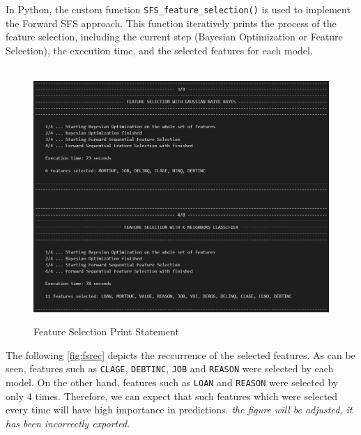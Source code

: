 In Python, the custom function \lstinline{SFS_feature_selection()} is used to implement the Forward SFS approach.
This function iteratively prints the process of the feature selection, including the current step (Bayesian Optimization or Feature Selection), the execution time, and the selected features for each model.

\begin{figure}[H]
    \centering
    \caption{Feature Selection Print Statement}\vspace{0.5em}
    \label{fig:fsprint}\
    \includegraphics[width=140mm]{Figures/fs_print.jpg}
    \vspace{-1em}
\end{figure}


The following \autoref{fig:fsrec} depicts the reccurrence of the selected features. As can be seen, features such as \texttt{CLAGE}, \texttt{DEBTINC}, \texttt{JOB} and \texttt{REASON} were selected by each model. 
On the other hand, features such as \texttt{LOAN} and \texttt{REASON} were selected by only 4 times. Therefore, we can expect that such features which were selected every time will have high importance in predictions. \textit{the figure will be adjusted, it has been incorrectly exported}.

